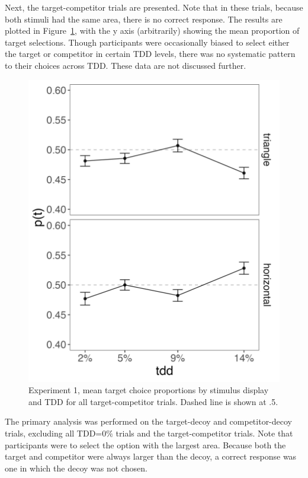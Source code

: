 Next, the target-competitor trials are presented. Note that in these trials, because both stimuli had the same area, there is no correct response. The results are plotted in Figure~\ref{fig:e1_tc}, with the y axis (arbitrarily) showing the mean proportion of target selections. Though participants were occasionally biased to select either the target or competitor in certain TDD levels, there was no systematic pattern to their choices across TDD. These data are not discussed further.

\begin{figure}
   \includegraphics[width=\textwidth]{figures/2afc_tc_choices.jpeg}
   \caption{Experiment 1, mean target choice proportions by stimulus display and TDD for all target-competitor trials. Dashed line is shown at .5.}
   \label{fig:e1_tc}
\end{figure}

The primary analysis was performed on the target-decoy and competitor-decoy trials, excluding all TDD=$0\%$ trials and the target-competitor trials. Note that participants were to select the option with the largest area. Because both the target and competitor were always larger than the decoy, a correct response was one in which the decoy was not chosen. 

